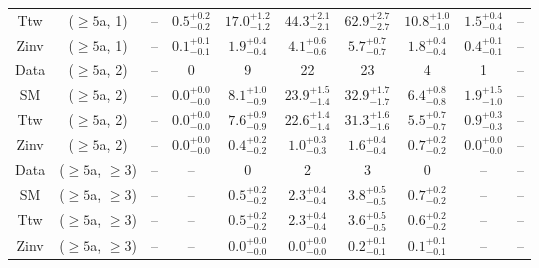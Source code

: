 \begin{table}[h!]
{\begin{tabular}{cccccccccc}
	Ttw & ($\ge5$a, 1) & -- & $0.5^{+ 0.2 }_{- 0.2 }$ & $17.0^{+ 1.2 }_{- 1.2 }$ & $44.3^{+ 2.1 }_{- 2.1 }$ & $62.9^{+ 2.7 }_{- 2.7 }$ & $10.8^{+ 1.0 }_{- 1.0 }$ & $1.5^{+ 0.4 }_{- 0.4 }$ & -- \\[0.5ex] 
	Zinv & ($\ge5$a, 1) & -- & $0.1^{+ 0.1 }_{- 0.1 }$ & $1.9^{+ 0.4 }_{- 0.4 }$ & $4.1^{+ 0.6 }_{- 0.6 }$ & $5.7^{+ 0.7 }_{- 0.7 }$ & $1.8^{+ 0.4 }_{- 0.4 }$ & $0.4^{+ 0.1 }_{- 0.1 }$ & -- \\[0.5ex] 
	Data & ($\ge5$a, 2) & -- & 0 & 9 & 22 & 23 & 4 & 1 & -- \\[0.5ex] 
	SM & ($\ge5$a, 2) & -- & $0.0^{+ 0.0 }_{- 0.0 }$ & $8.1^{+ 1.0 }_{- 0.9 }$ & $23.9^{+ 1.5 }_{- 1.4 }$ & $32.9^{+ 1.7 }_{- 1.7 }$ & $6.4^{+ 0.8 }_{- 0.8 }$ & $1.9^{+ 1.5 }_{- 1.0 }$ & -- \\[0.5ex] 
	Ttw & ($\ge5$a, 2) & -- & $0.0^{+ 0.0 }_{- 0.0 }$ & $7.6^{+ 0.9 }_{- 0.9 }$ & $22.6^{+ 1.4 }_{- 1.4 }$ & $31.3^{+ 1.6 }_{- 1.6 }$ & $5.5^{+ 0.7 }_{- 0.7 }$ & $0.9^{+ 0.3 }_{- 0.3 }$ & -- \\[0.5ex] 
	Zinv & ($\ge5$a, 2) & -- & $0.0^{+ 0.0 }_{- 0.0 }$ & $0.4^{+ 0.2 }_{- 0.2 }$ & $1.0^{+ 0.3 }_{- 0.3 }$ & $1.6^{+ 0.4 }_{- 0.4 }$ & $0.7^{+ 0.2 }_{- 0.2 }$ & $0.0^{+ 0.0 }_{- 0.0 }$ & -- \\[0.5ex] 
	Data & ($\ge5$a, $\ge3$) & -- & -- & 0 & 2 & 3 & 0 & -- & -- \\[0.5ex] 
	SM & ($\ge5$a, $\ge3$) & -- & -- & $0.5^{+ 0.2 }_{- 0.2 }$ & $2.3^{+ 0.4 }_{- 0.4 }$ & $3.8^{+ 0.5 }_{- 0.5 }$ & $0.7^{+ 0.2 }_{- 0.2 }$ & -- & -- \\[0.5ex] 
	Ttw & ($\ge5$a, $\ge3$) & -- & -- & $0.5^{+ 0.2 }_{- 0.2 }$ & $2.3^{+ 0.4 }_{- 0.4 }$ & $3.6^{+ 0.5 }_{- 0.5 }$ & $0.6^{+ 0.2 }_{- 0.2 }$ & -- & -- \\[0.5ex] 
	Zinv & ($\ge5$a, $\ge3$) & -- & -- & $0.0^{+ 0.0 }_{- 0.0 }$ & $0.0^{+ 0.0 }_{- 0.0 }$ & $0.2^{+ 0.1 }_{- 0.1 }$ & $0.1^{+ 0.1 }_{- 0.1 }$ & -- & -- \\[0.5ex] 
	\hline
	\hline
\end{tabular}}
\end{table}
